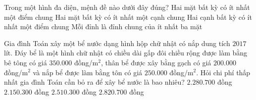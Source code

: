 \begin{ex}%
	Trong một hình đa diện, mệnh đề nào dưới đây đúng?
	\choice
	{Hai mặt bất kỳ có ít nhất một điểm chung}
	{Hai mặt bất kỳ có ít nhất một cạnh chung}
	{Hai cạnh bất kỳ có ít nhất một điểm chung}
	{\True Mỗi đỉnh là đỉnh chung của ít nhất ba mặt}
\end{ex}

\begin{ex}%
	Gia đình Toán xây một bể nước dạng hình hộp chữ nhật có nắp dung tích $2017$ lít. Đáy bể là một hình chữ nhật có chiều dài gấp đôi chiều rộng được làm bằng bê tông có giá $350.000$ đồng/m$^2$, thân bể được xây bằng gạch có giá $200.000$ đồng/m$^2$ và nắp bể được làm bằng tôn có giá $250.000$ đồng/m$^2$. Hỏi chi phí thấp nhất gia đình Toán cần bỏ ra để xây bể nước là bao nhiêu?
	\choice
	{\True $2.280.700$ đồng}
	{$2.150.300$ đồng}
	{$2.510.300$ đồng}
	{$2.820.700$ đồng}
\end{ex}

